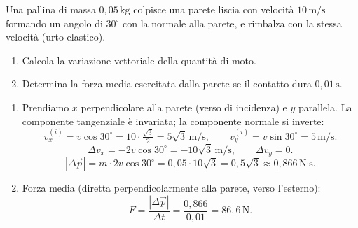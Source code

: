 \begin{question}[ID=1.4, subtitle={Rimbalzo obliquo su parete liscia}, tags={quantità di moto, urto con parete}, difficulty=difficile]
Una pallina di massa \(0{,}05 \, \text{kg}\) colpisce una parete liscia con velocità \(10 \, \text{m/s}\) formando un angolo di \(30^\circ\) con la normale alla parete, e rimbalza con la stessa velocità (urto elastico).
\begin{enumerate}
    \item Calcola la variazione vettoriale della quantità di moto.
    \item Determina la forza media esercitata dalla parete se il contatto dura \(0{,}01 \, \text{s}\).
\end{enumerate}
\begin{solution}
    \begin{enumerate}
        \item Prendiamo \(x\) perpendicolare alla parete (verso di incidenza) e \(y\) parallela.
        La componente tangenziale è invariata; la componente normale si inverte:
        \[
            v_x^{(i)} = v\cos30^\circ = 10 \cdot \tfrac{\sqrt{3}}{2} = 5\sqrt{3} \, \text{m/s},
            \qquad v_y^{(i)} = v\sin30^\circ = 5 \, \text{m/s}.
        \]
        \[
            \Delta v_x = -2v\cos30^\circ = -10\sqrt{3} \, \text{m/s}, \qquad \Delta v_y = 0.
        \]
        \[
            |\Delta\vec{p}| = m \cdot 2v\cos30^\circ = 0{,}05 \cdot 10\sqrt{3} = 0{,}5\sqrt{3} \approx 0{,}866 \, \text{N·s}.
        \]
        \item Forza media (diretta perpendicolarmente alla parete, verso l'esterno):
        \[
            F = \frac{|\Delta\vec{p}|}{\Delta t} = \frac{0{,}866}{0{,}01} = 86{,}6 \, \text{N}.
        \]
    \end{enumerate}
\end{solution}
\end{question}


